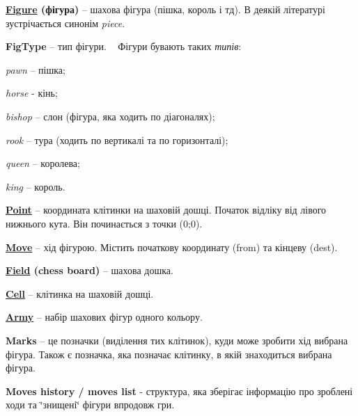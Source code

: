 \label{index_md_glossary}%
%
 {\bfseries{\mbox{\hyperlink{class_figure}{Figure}} (фігура)}} – шахова фігура (пішка, король і тд). В деякій літературі зустрічається синонім {\itshape piece}.

{\bfseries{Fig\+Type}} – тип фігури. ~\newline
 Фігури бувають таких {\itshape типів}\+:
\begin{DoxyItemize}
\item {\itshape pawn} – пішка;
\item {\itshape horse} -\/ кінь;
\item {\itshape bishop} – слон (фігура, яка ходить по діагоналях);
\item {\itshape rook} – тура (ходить по вертикалі та по горизонталі);
\item {\itshape queen} – королева;
\item {\itshape king} – король.
\end{DoxyItemize}

{\bfseries{\mbox{\hyperlink{struct_point}{Point}}}} – координата клітинки на шаховій дошці. Початок відліку від лівого нижнього кута. Він починається з точки (0;0).

{\bfseries{\mbox{\hyperlink{struct_move}{Move}}}} – хід фігурою. Містить початкову координату (from) та кінцеву (dest).

{\bfseries{\mbox{\hyperlink{class_field}{Field}} (chess board)}} – шахова дошка.

{\bfseries{\mbox{\hyperlink{struct_cell}{Cell}}}} – клітинка на шаховій дошці.

{\bfseries{\mbox{\hyperlink{class_army}{Army}}}} – набір шахових фігур одного кольору.

{\bfseries{Marks}} – це позначки (виділення тих клітинок), куди може зробити хід вибрана фігура. Також є позначка, яка позначає клітинку, в якій знаходиться вибрана фігура.

{\bfseries{Moves history / moves list}} -\/ структура, яка зберігає інформацію про зроблені ходи та \char`\"{}знищені\char`\"{} фігури впродовж гри. 